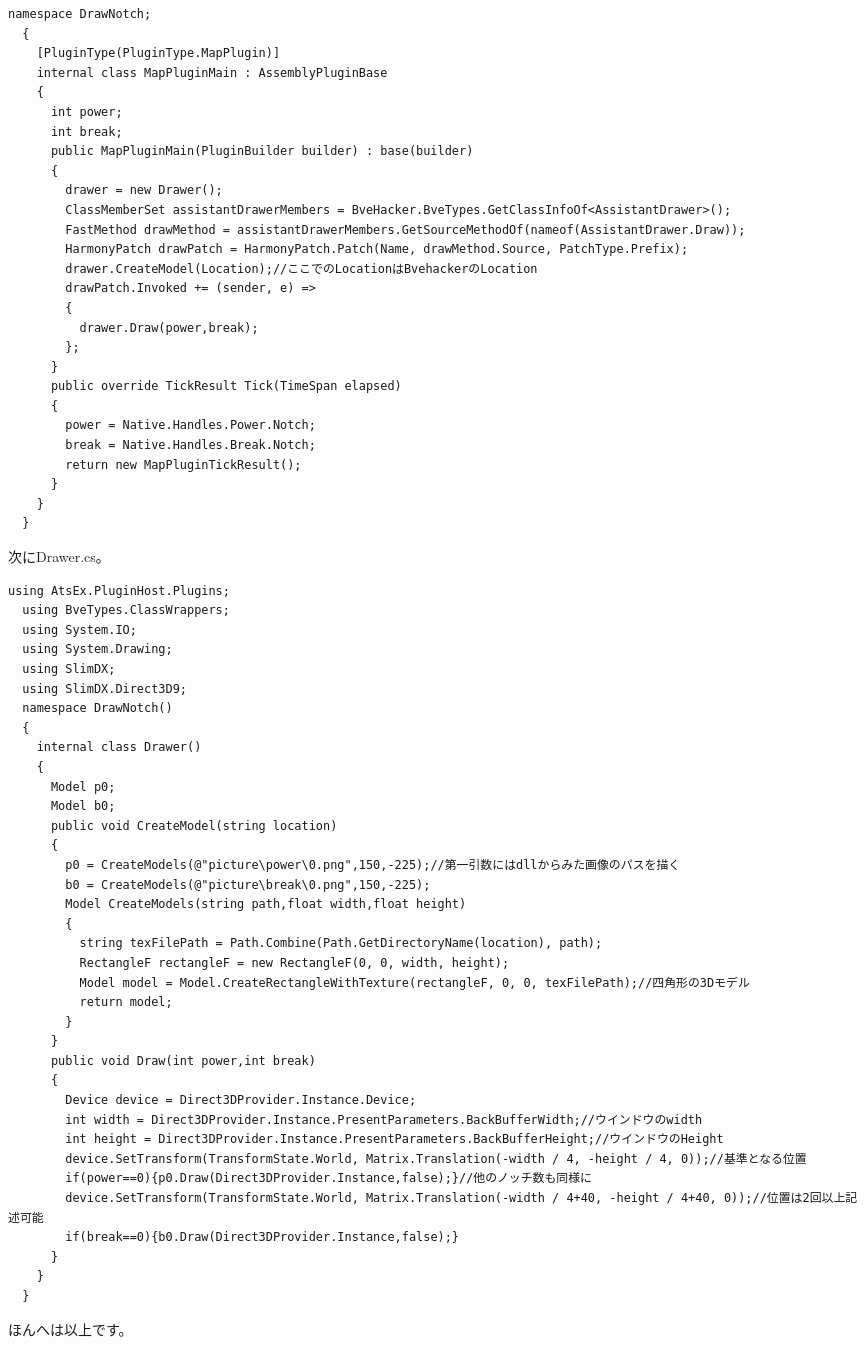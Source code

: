 \documentclass[b5paper,9pt,platex,dvipdfmx]{jsarticle}
\begin{document}
\begin{multicols*}{3}
\begin{lstlisting}[caption = MapPluginMain.cs]
  namespace DrawNotch;
  {
    [PluginType(PluginType.MapPlugin)]
    internal class MapPluginMain : AssemblyPluginBase
    {
      int power;
      int break;
      public MapPluginMain(PluginBuilder builder) : base(builder)
      {
        drawer = new Drawer();
        ClassMemberSet assistantDrawerMembers = BveHacker.BveTypes.GetClassInfoOf<AssistantDrawer>();
        FastMethod drawMethod = assistantDrawerMembers.GetSourceMethodOf(nameof(AssistantDrawer.Draw));
        HarmonyPatch drawPatch = HarmonyPatch.Patch(Name, drawMethod.Source, PatchType.Prefix);
        drawer.CreateModel(Location);//ここでのLocationはBvehackerのLocation
        drawPatch.Invoked += (sender, e) =>
        {
          drawer.Draw(power,break);
        };
      }
      public override TickResult Tick(TimeSpan elapsed)
      {
        power = Native.Handles.Power.Notch;
        break = Native.Handles.Break.Notch;
        return new MapPluginTickResult();
      }
    }
  }
\end{lstlisting}
次にDrawer.cs。\\
\begin{lstlisting}[caption = Drawer.cs]
  using AtsEx.PluginHost.Plugins;
  using BveTypes.ClassWrappers;
  using System.IO;
  using System.Drawing;
  using SlimDX;
  using SlimDX.Direct3D9;
  namespace DrawNotch()
  {
    internal class Drawer()
    {
      Model p0;
      Model b0;
      public void CreateModel(string location)
      {
        p0 = CreateModels(@"picture\power\0.png",150,-225);//第一引数にはdllからみた画像のパスを描く
        b0 = CreateModels(@"picture\break\0.png",150,-225);
        Model CreateModels(string path,float width,float height)
        {
          string texFilePath = Path.Combine(Path.GetDirectoryName(location), path);
          RectangleF rectangleF = new RectangleF(0, 0, width, height);
          Model model = Model.CreateRectangleWithTexture(rectangleF, 0, 0, texFilePath);//四角形の3Dモデル
          return model;
        }
      }
      public void Draw(int power,int break)
      {
        Device device = Direct3DProvider.Instance.Device;
        int width = Direct3DProvider.Instance.PresentParameters.BackBufferWidth;//ウインドウのwidth
        int height = Direct3DProvider.Instance.PresentParameters.BackBufferHeight;//ウインドウのHeight
        device.SetTransform(TransformState.World, Matrix.Translation(-width / 4, -height / 4, 0));//基準となる位置
        if(power==0){p0.Draw(Direct3DProvider.Instance,false);}//他のノッチ数も同様に
        device.SetTransform(TransformState.World, Matrix.Translation(-width / 4+40, -height / 4+40, 0));//位置は2回以上記述可能
        if(break==0){b0.Draw(Direct3DProvider.Instance,false);}
      }
    }
  }
\end{lstlisting}
ほんへは以上です。\\

\end{multicols*}
\end{document}

